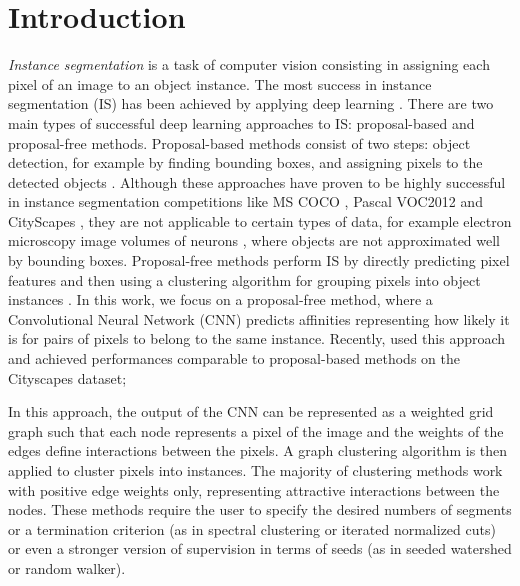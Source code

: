 
\section{Introduction}

\emph{Instance segmentation} is a task of computer vision consisting in assigning each pixel of an image to an object instance. %
The most success in instance segmentation (IS) has been achieved by applying deep learning \cite{he2017mask,romera2016recurrent,liu2018affinity}. There are two main types of successful deep learning approaches to IS: proposal-based and proposal-free methods. Proposal-based methods consist of two steps: object detection, for example by finding bounding boxes, and assigning pixels to the detected objects \cite{he2017mask,dai2016instance,li2017fully}. Although these approaches have proven to be highly successful in instance segmentation competitions like MS COCO \cite{lin2014microsoft}, Pascal VOC2012 \cite{everingham2010pascal} and CityScapes \cite{cordts2016cityscapes}, they are not applicable to certain types of data, for example electron microscopy image volumes of neurons \cite{arganda2015crowdsourcing}, where objects are not approximated well by bounding boxes. 
Proposal-free methods perform IS by directly predicting pixel features and then using a clustering algorithm for grouping pixels into object instances . In this work, we focus on a proposal-free method, where a Convolutional Neural Network (CNN) predicts affinities representing how likely it is for pairs of pixels to belong to the same instance. Recently, \cite{liu2018affinity} used this approach and achieved performances comparable to proposal-based methods on the Cityscapes dataset;  

In this approach, the output of the CNN can be represented as a weighted grid graph such that each node represents a pixel of the image and the weights of the edges define interactions between the pixels. A graph clustering algorithm is then applied to cluster pixels into instances. The majority of clustering methods work with positive edge weights only, representing attractive interactions between the nodes. These methods require the user to specify the desired numbers of segments or a termination criterion (as in spectral clustering or iterated normalized cuts) or even a stronger version of supervision in terms of seeds (as in seeded watershed or random walker).  

